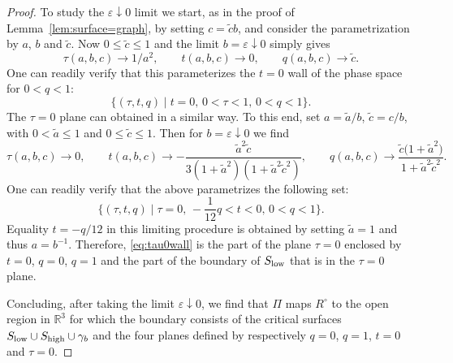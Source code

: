 \documentclass[pdftex]{sigma}
\newcommand{\eps}{\varepsilon}
\numberwithin{equation}{section}
\begin{document}
\begin{proof}
To study the $\eps \downarrow 0$ limit we start, as in the proof of Lemma~\ref{lem:surface=graph}, by setting
$c=\tilde c b$,
and consider the parametrization by $a$, $b$ and $\tilde c$. Now $0\leq \tilde c \leq 1$ and the limit $b= \eps\downarrow 0$ simply gives
\begin{equation*} %
 \tau(a,b,c)\to 1/a^2, \qquad t(a,b, c)\to 0,\qquad q(a,b,c) \to \tilde c.
\end{equation*}
 One can readily verify that this parameterizes the $t=0$ wall of the phase space for $0 < q < 1$:
 \begin{equation*} %
 \{(\tau,t,q)\mid t = 0,\, 0 < \tau < 1,\, 0 < q < 1\}.
 \end{equation*}
The $\tau=0$ plane can obtained in a similar way. To this end, set
$
 a=\tilde a/b$, $\tilde c=c/b$,
 with $0<\tilde a\leq 1$ and $0\leq \tilde c \leq 1$.
 Then for $b=\eps\downarrow 0$ we find
 \begin{equation*}
 \tau( a,b, c)\to 0,\qquad t( a,b, c) \to -\frac{\tilde a^2 \tilde c}{3(1+\tilde a^2)(1+\tilde a^2 \tilde c^2)},\qquad
 q( a,b, c) \to \frac{\tilde c\bigl(
 1+\tilde a^2\bigr)}{1+\tilde a^2\tilde c^2}.
 \end{equation*}
 One can readily verify that the above parametrizes the following set:
 \begin{equation} \label{eq:tau0wall}
 \biggl\{(\tau,t,q)\mid \tau = 0,\, -\frac{1}{12}q<t<0,\, 0 < q < 1\biggr\}.
 \end{equation}
 Equality $t=-q/12$ in this limiting procedure is obtained by setting $\tilde a=1$ and thus $a=b^{-1}$. Therefore, \eqref{eq:tau0wall} is the part of the plane $\tau=0$ enclosed by $t=0$, $q=0$, $q=1$ and the part of the boundary of $S_{{\rm low}}$ that is in the $\tau=0$ plane.



 Concluding, after taking the limit $\eps \downarrow 0$, we find that $\Pi$ maps $R^{\circ}$ to the open region in $\mathbb R^3$ for which the boundary consists of the critical surfaces $S_{{\rm low}} \cup S_{{\rm high}}\cup \gamma_b$ and the four planes defined by respectively $q=0$, $q=1$, $t=0$ and $\tau=0$.


\end{proof}
\end{document}
